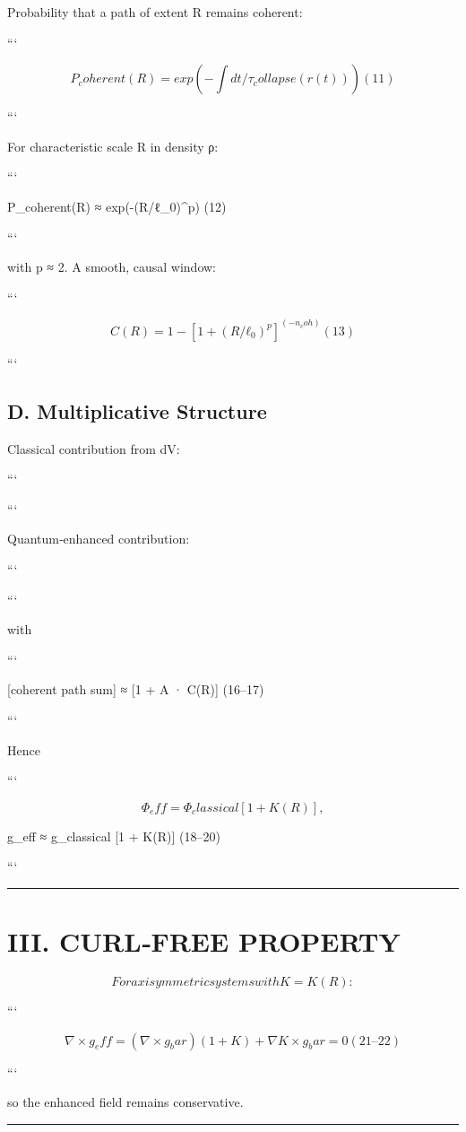 \documentclass[11pt,a4paper]{article}
\begin{document}
Probability that a path of extent R remains coherent:

```

\[
P_coherent(R) = exp(-∫ dt/τ_collapse(r(t)))     (11)
\]

```


For characteristic scale R in density ρ:

```

P\_coherent(R) ≈ exp(-(R/ℓ\_0)^p)     (12)

```


with p ≈ 2. A smooth, causal window:

```

\[
C(R) = 1 - [1 + (R/ℓ_0)^p]^(-n_coh)     (13)
\]

```


\subsection{D. Multiplicative Structure}


Classical contribution from dV:

```

```

Quantum‑enhanced contribution:

```

```

with

```

[coherent path sum] ≈ [1 + A · C(R)]     (16–17)

```

Hence

```

\[
Φ_eff = Φ_classical [1 + K(R)],
\]

 g\_eff ≈ g\_classical [1 + K(R)]     (18–20)

```


\medskip\hrule\medskip


\section{III. CURL‑FREE PROPERTY}


\[
For axisymmetric systems with K=K(R):
\]

```

\[
∇ × g_eff = (∇ × g_bar)(1+K) + ∇K × g_bar = 0     (21–22)
\]

```

so the enhanced field remains conservative.


\medskip\hrule\medskip
\end{document}

